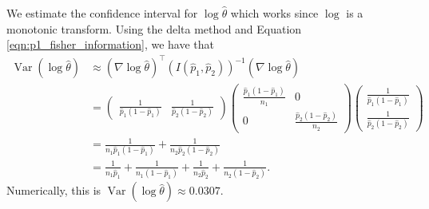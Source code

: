 \documentclass[letterpaper,11pt]{article}
\begin{document}
\begin{enumerate}
\begin{enumerate}
\begin{description}
      We estimate the confidence interval for $\log\hat{\theta}$ which works
      since $\log$ is a monotonic transform. Using the delta method and Equation
      \ref{eqn:p1_fisher_information}, we have that
      \begin{align}
        \operatorname{Var}\left(
        \log\hat{\theta}\right)
        &\approx \left(\nabla \log\hat{\theta}\right)^\intercal
        \left(I\left(\hat{p}_1,\hat{p}_2\right)\right)^{-1}
          \left(\nabla \log\hat{\theta}\right) \nonumber\\
        &=
          \begin{pmatrix}
            \frac{1}{\hat{p}_1\left(1 - \hat{p}_1\right)} &
            \frac{1}{\hat{p}_2\left(1 - \hat{p}_2\right)}
          \end{pmatrix}
          \begin{pmatrix}
            \frac{\hat{p}_1\left(1 - \hat{p}_1\right)}{n_1} & 0 \\
            0 & \frac{\hat{p}_2\left(1 - \hat{p}_2\right)}{n_2}
          \end{pmatrix}
                \begin{pmatrix}
                  \frac{1}{\hat{p}_1\left(1 - \hat{p}_1\right)} \\
                  \frac{1}{\hat{p}_2\left(1 - \hat{p}_2\right)}
                \end{pmatrix} \nonumber\\
        &= \frac{1}{n_1\hat{p}_1\left(1 - \hat{p}_1\right)} +
          \frac{1}{n_2\hat{p}_2\left(1 - \hat{p}_2\right)} \nonumber\\
        &= \frac{1}{n_1\hat{p}_1} + \frac{1}{n_1\left(1 - \hat{p}_1\right)} +
          \frac{1}{n_2\hat{p}_2} + \frac{1}{n_2\left(1 - \hat{p}_2\right)}.
      \end{align}
      Numerically, this is
      $\operatorname{Var}\left(\log\hat{\theta}\right) \approx 0.0307$.


\end{description}
\end{enumerate}
\end{enumerate}
\end{document}
